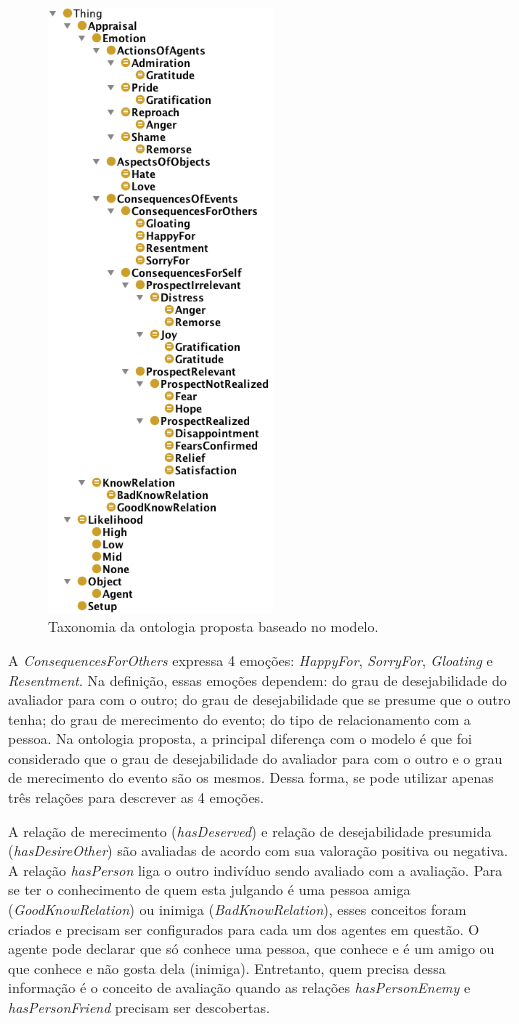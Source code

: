 \begin{figure}
  \includegraphics[height=16cm]{figuras/hierarquiaLOCC.png}
  \caption{Taxonomia da ontologia proposta baseado no modelo.}
  \label{fig:tlocc}
\end{figure}

A \emph{ConsequencesForOthers} expressa 4 emoções: \emph{HappyFor},
\emph{SorryFor}, \emph{Gloating} e \emph{Resentment}. Na definição, essas
emoções dependem: do grau de desejabilidade do avaliador para com o outro; do
grau de desejabilidade que se presume que o outro tenha; do grau de
merecimento do evento; do tipo de relacionamento com a pessoa. Na ontologia
proposta, a principal diferença com o modelo \occ é que foi considerado
que o grau de desejabilidade do avaliador para com o outro e o grau de
merecimento do evento são os mesmos. Dessa forma, se pode utilizar apenas três
relações para descrever as 4 emoções.

A relação de merecimento (\emph{hasDeserved}) e relação de desejabilidade
presumida (\emph{hasDesireOther}) são avaliadas de acordo com sua valoração
positiva ou negativa. A relação \emph{hasPerson} liga o outro indivíduo
sendo avaliado com a avaliação. Para se ter o conhecimento de quem esta
julgando é uma pessoa amiga (\emph{GoodKnowRelation}) ou inimiga
(\emph{BadKnowRelation}), esses conceitos foram criados e precisam ser
configurados para cada um dos agentes em questão. O agente pode declarar que
só conhece uma pessoa, que conhece e é um amigo ou que conhece e não gosta
dela (inimiga). Entretanto, quem precisa dessa informação é o conceito de
avaliação quando as relações \emph{hasPersonEnemy} e \emph{hasPersonFriend}
precisam ser descobertas.

